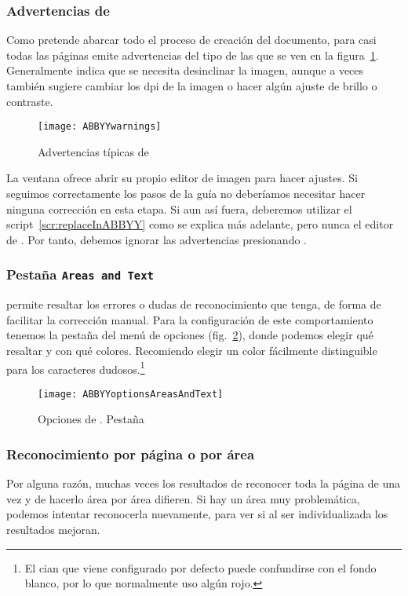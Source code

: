 \documentclass[%
	a5paper,
	10pt,
	twoside,
	openright,
	final,
]{memoir}
\begin{document}
{	\subsubsection{Advertencias de \abbyy\label{sec:ABBYYwarnings}} Como \abbyy pretende abarcar todo el proceso de creación del documento, para casi todas las páginas emite advertencias del tipo de las que se ven en la figura~\ref{fig:ABBYYwarnings}. Generalmente indica que se necesita desinclinar la imagen, aunque a veces también sugiere cambiar los dpi de la imagen o hacer algún ajuste de brillo o contraste.

	\begin{figure}
		\centering
		\texttt{[image: ABBYYwarnings]}
		\caption{Advertencias típicas de \abbyy\label{fig:ABBYYwarnings}}
	\end{figure}

	La ventana ofrece abrir su propio editor de imagen para hacer ajustes. Si seguimos correctamente los pasos de la guía no deberíamos necesitar hacer ninguna corrección en esta etapa. Si aun así fuera, deberemos utilizar el script~\ref{scr:replaceInABBYY} como se explica más adelante, pero nunca el editor de \abbyy. Por tanto, debemos ignorar las advertencias presionando .

	\subsubsection{Pestaña \texttt{Areas and Text}} \abbyy permite resaltar los errores o dudas de reconocimiento que tenga, de forma de facilitar la corrección manual. Para la configuración de este comportamiento tenemos la pestaña  del menú de opciones (fig.~\ref{fig:ABBYYoptionsAreasAndText}), donde podemos elegir qué resaltar y con qué colores. Recomiendo elegir un color fácilmente distinguible para los caracteres dudosos.\footnote{El cian que viene configurado por defecto puede confundirse con el fondo blanco, por lo que normalmente uso algún rojo.}

	\begin{figure}
		\texttt{[image: ABBYYoptionsAreasAndText]}
		\caption[Opciones de \abbyy. Pestaña \texttt{Areas and Text}]{Opciones de \abbyy. Pestaña \label{fig:ABBYYoptionsAreasAndText}}
	\end{figure}

	\subsubsection{Reconocimiento por página o por área} Por alguna razón, muchas veces los resultados de reconocer toda la página de una vez y de hacerlo área por área difieren. Si hay un área muy problemática, podemos intentar reconocerla nuevamente, para ver si al ser individualizada los resultados mejoran.

}
\end{document}
